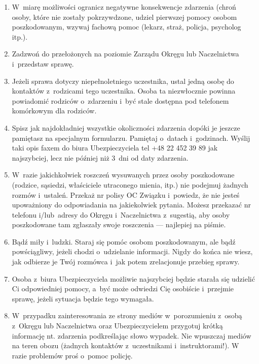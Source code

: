 \begin{enumerate}
\item W~miarę możliwości ogranicz negatywne konsekwencje zdarzenia (chroń osoby, które nie zostały pokrzywdzone, udziel pierwszej pomocy osobom poszkodowanym, wzywaj fachową pomoc (lekarz, straż, policja, psycholog itp.).
\item Zadzwoń do przełożonych na poziomie Zarządu Okręgu lub Naczelnictwa i~przedstaw sprawę.
\item Jeżeli sprawa dotyczy niepełnoletniego uczestnika, ustal jedną osobę do kontaktów z~rodzicami tego uczestnika. Osoba ta niezwłocznie powinna powiadomić rodziców o~zdarzeniu i~być stale dostępna pod telefonem komórkowym dla rodziców.
\item Spisz jak najdokładniej wszystkie okoliczności zdarzenia dopóki je jeszcze pamiętasz na specjalnym formularzu. Pamiętaj o~datach i~godzinach. Wyślij taki opis faxem do biura Ubezpieczyciela tel +48 22 452 39 89 jak najszybciej, lecz nie później niż 3~dni od daty zdarzenia.
\item W~razie jakichkolwiek roszczeń wysuwanych przez osoby poszkodowane (rodzice, sąsiedzi, właściciele utraconego mienia, itp.) nie podejmuj żadnych rozmów i~ustaleń. Przekaż nr polisy OC Związku i~powiedz, że nie jesteś upoważniony do odpowiadania na jakiekolwiek pytania. Możesz przekazać nr telefonu i/lub~adresy do Okręgu i~Naczelnictwa z~sugestią, aby osoby poszkodowane tam zgłaszały swoje roszczenia --- najlepiej na piśmie.
\item Bądź miły i~ludzki. Staraj się pomóc osobom poszkodowanym, ale bądź powściągliwy, jeżeli chodzi o~udzielanie informacji. Nigdy do końca nie wiesz, jak odbierze je Twój rozmówca i~jak potem zrelacjonuje przebieg sprawy.
\item Osoba z~biura Ubezpieczyciela możliwie najszybciej będzie starała się udzielić Ci odpowiedniej pomocy, a~być może odwiedzi Cię osobiście i~przejmie sprawę, jeżeli sytuacja będzie tego wymagała.
\item W~przypadku zainteresowania ze strony mediów w~porozumieniu z~osobą z~Okręgu lub Naczelnictwa oraz Ubezpieczycielem przygotuj krótką informację nt. zdarzenia podkreślając słowo wypadek. Nie wpuszczaj mediów na teren obozu (żadnych kontaktów z~uczestnikami i~instruktorami!). W razie problemów proś o~pomoc policję.
\end{enumerate}